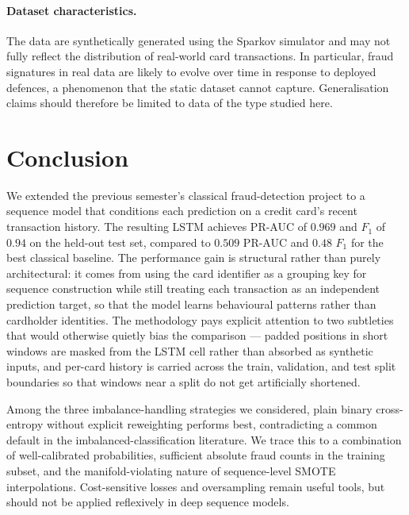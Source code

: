 \documentclass[oneside,12pt,parskip=half,american,numbers=noenddot]{scrreprt}
\begin{document}
\paragraph{Dataset characteristics.}
The data are synthetically generated using the Sparkov simulator and may not fully reflect the distribution of real-world card transactions. In particular, fraud signatures in real data are likely to evolve over time in response to deployed defences, a phenomenon that the static dataset cannot capture. Generalisation claims should therefore be limited to data of the type studied here.


\section{Conclusion}

We extended the previous semester's classical fraud-detection project to a sequence model that conditions each prediction on a credit card's recent transaction history. The resulting LSTM achieves PR-AUC of $0.969$ and $F_1$ of $0.94$ on the held-out test set, compared to $0.509$ PR-AUC and $0.48$ $F_1$ for the best classical baseline. The performance gain is structural rather than purely architectural: it comes from using the card identifier as a grouping key for sequence construction while still treating each transaction as an independent prediction target, so that the model learns behavioural patterns rather than cardholder identities. The methodology pays explicit attention to two subtleties that would otherwise quietly bias the comparison — padded positions in short windows are masked from the LSTM cell rather than absorbed as synthetic inputs, and per-card history is carried across the train, validation, and test split boundaries so that windows near a split do not get artificially shortened.

Among the three imbalance-handling strategies we considered, plain binary cross-entropy without explicit reweighting performs best, contradicting a common default in the imbalanced-classification literature. We trace this to a combination of well-calibrated probabilities, sufficient absolute fraud counts in the training subset, and the manifold-violating nature of sequence-level SMOTE interpolations. Cost-sensitive losses and oversampling remain useful tools, but should not be applied reflexively in deep sequence models.
\end{document}
